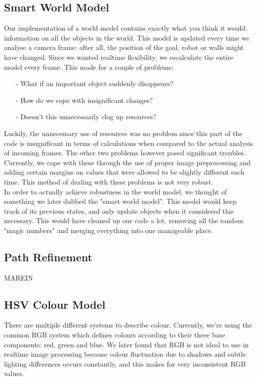 \documentclass[10pt,twocolumn]{scrartcl}
\begin{document}
\subsection{Smart World Model}
Our implementation of a world model contains exactly what you think it would: information on all the objects in the world. This model is updated every time we analyse a camera frame: after all, the position of the goal, robot or walls might have changed. Since we wanted realtime flexibility, we recalculate the entire model every frame. This made for a couple of problems:
\begin{itemize}
\item[-] What if an important object suddenly disappears?
\item[-] How do we cope with insignificant changes?
\item[-] Doesn't this unnecessarily clog up resources?
\end{itemize}
Luckily, the unnecessary use of resources was no problem since this part of the code is insignificant in terms of calculations when compared to the actual analysis of incoming frames. The other two problems however posed significant troubles. Currently, we cope with these through the use of proper image preprocessing and adding certain margins on values that were allowed to be slightly different each time. This method of dealing with these problems is not very robust.\\
In order to actually achieve robustness in the world model, we thought of something we later dubbed the "smart world model". This model would keep track of its previous states, and only update objects when it considered this necessary. This would have cleaned up our code a lot, removing all the random "magic numbers" and merging everything into one manageable place.

\subsection{Path Refinement}
\label{sec:pathrefinement}
MAREIN

\subsection{HSV Colour Model}
There are multiple different systems to describe colour. Currently, we're using the common RGB system which defines colours according to their three base components: red, green and blue. We later found that RGB is not ideal to use in realtime image processing because colour fluctuation due to shadows and subtle lighting differences occurs constantly, and this makes for very inconsistent RGB values.
\end{document}
